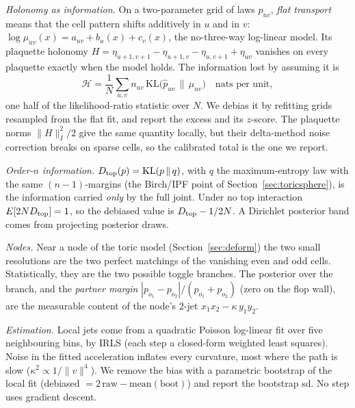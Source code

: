 \documentclass[11pt]{article}
\theoremstyle{definition}
\theoremstyle{remark}
\begin{document}
\emph{Holonomy as information.} On a two-parameter grid of laws $p_{uv}$, \emph{flat transport} means that the cell pattern shifts additively in $u$ and in $v$: $\log\mu_{uv}(x)=a_{uv}+b_{u}(x)+c_{v}(x)$, the no-three-way log-linear model. Its plaquette holonomy $H=\eta_{u+1,v+1}-\eta_{u+1,v}-\eta_{u,v+1}+\eta_{uv}$ vanishes on every plaquette exactly when the model holds. The information lost by assuming it is
\[ \mathcal H=\frac1N\sum_{u,v}n_{uv}\,\mathrm{KL}\bigl(\hat p_{uv}\,\|\,\hat\mu_{uv}\bigr)\quad\text{nats per unit}, \]
one half of the likelihood-ratio statistic over $N$. We debias it by refitting grids resampled from the flat fit, and report the excess and its $z$-score. The plaquette norms $\|H\|_I^2/2$ give the same quantity locally, but their delta-method noise correction breaks on sparse cells, so the calibrated total is the one we report.

\emph{Order-$n$ information.} $D_{\rm top}(p)=\mathrm{KL}(p\,\|\,q)$, with $q$ the maximum-entropy law with the same $(n-1)$-margins (the Birch/IPF point of Section~\ref{sec:toricsphere}), is the information carried \emph{only} by the full joint. Under no top interaction $E[2N D_{\rm top}]=1$, so the debiased value is $D_{\rm top}-1/2N$. A Dirichlet posterior band comes from projecting posterior draws.

\emph{Nodes.} Near a node of the toric model (Section~\ref{sec:deform}) the two small resolutions are the two perfect matchings of the vanishing even and odd cells. Statistically, they are the two possible toggle branches. The posterior over the branch, and the \emph{partner margin} $|p_{o_1}-p_{o_2}|/(p_{o_1}+p_{o_2})$ (zero on the flop wall), are the measurable content of the node's 2-jet $x_1x_2-\kappa\,y_1y_2$.

\emph{Estimation.} Local jets come from a quadratic Poisson log-linear fit over five neighbouring bins, by IRLS \cite{mccullaghnelder89} (each step a closed-form weighted least squares). Noise in the fitted acceleration inflates every curvature, most where the path is slow ($\kappa^2\propto1/\|v\|^4$). We remove the bias with a parametric bootstrap of the local fit (debiased $=2\,\mathrm{raw}-\mathrm{mean}(\mathrm{boot})$) and report the bootstrap sd. No step uses gradient descent.
\end{document}
